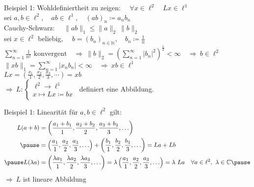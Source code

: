 \documentclass[AERbeamer%
,optBeamerClassicFormat%
,optLeftEquations   %
]{AERlatex}
\begin{document}
    \begin{frame}{Beispiel 1: Wohldefiniertheit}
        \setlength{\baselineskip}{1.6\baselineskip}
        zu zeigen: $\quad \forall x \in \ell^2 \quad L x \in \ell^1$ \\ \pause
        sei $a, b \in \ell^2, \quad a b \in \ell^1, \quad (a b)_n\coloneqq a_n b_n$ \\ \pause
        Cauchy-Schwarz: $\quad \|a b\|_1 \leq\|a\|_2~\|b\|_2$ \\ \pause
        sei $x \in \ell^2$ beliebig, $\quad b=\left(b_n\right)_{n \in \mathbb{N}}, \quad b_n\coloneqq\frac{1}{n}$ \\ \pause
        $\sum_{n=1}^{\infty} \frac{1}{n^2} \text { konvergent} \quad \Rightarrow ~\|b\|_2=\left(\sum_{n=1}^{\infty}\left|b_n\right|^2\right)^{\frac{1}{2}}<\infty \quad \Rightarrow ~ b \in \ell^2$ \\ \pause
        $\|x b\|_1=\sum_{n=1}^{\infty}\left|x_n b_n\right|<\infty \quad \Rightarrow ~ x b \in \ell^1$ \\ \pause
        $L x=\left(\frac{x_1}{1}, \frac{x_2}{2}, \frac{x_3}{3}, \cdots\right)=x b$ \\ \pause
        \vspace{0.5em}
        $\Rightarrow ~ L:\left\{\begin{array}{l}
                                    \ell^2 \rightarrow \ell^1 \\ x \mapsto L x\coloneqq b x
        \end{array}\right.~$  definiert eine Abbildung.
    \end{frame}
%
    \begin{frame}{Beispiel 1: Linearität}
        \setlength{\baselineskip}{1.6\baselineskip}
        für $a, b \in \ell^2$ gilt:
        \begin{equation*}
            \begin{aligned}
                L(a+b)&=\left(\frac{a_1+b_1}{1}, \frac{a_2+b_2}{2}, \frac{a_3+b_3}{3}, \ldots\right) \\ \pause
                &=\left(\frac{a_1}{1}, \frac{a_2}{2}, \frac{a_3}{3}, \ldots\right)+\left(\frac{b_1}{1}, \frac{b_2}{2}, \frac{b_3}{3}, \ldots\right)=L a+L b \\ \pause
                L(\lambda a)&=\left(\frac{\lambda a_1}{1}, \frac{\lambda a_2}{2}, \frac{\lambda a_3}{3}, \ldots\right)=\lambda\left(\frac{a_1}{1}, \frac{a_2}{2}, \frac{a_3}{3}, \ldots\right)=\lambda ~ L a \quad \forall a \in \ell^{2}, ~\lambda \in \mathbb{C} \pause
            \end{aligned}
        \end{equation*}
        $\Rightarrow ~ L$  ist lineare Abbildung
    \end{frame}
\end{document}
